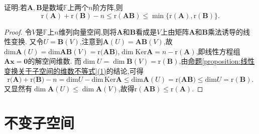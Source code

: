 \documentclass[lang=cn,newtx,10pt,scheme=chinese]{elegantbook}
\begin{document}
\begin{example}\label{example:4.243456}
证明:若\(\boldsymbol{A},\boldsymbol{B}\)是数域\(\mathbb{F}\)上两个\(n\)阶方阵,则
\[
\text{r}(\boldsymbol{A})+\text{r}(\boldsymbol{B})-n\leq\text{r}(\boldsymbol{A}\boldsymbol{B})\leq\min\{\text{r}(\boldsymbol{A}),\text{r}(\boldsymbol{B})\}.
\]
\end{example}
\begin{proof}
令\(V\)是\(\mathbb{F}\)上\(n\)维列向量空间,则将\(\boldsymbol{A}\)和\(\boldsymbol{B}\)看成是\(V\)上由矩阵\(\boldsymbol{A}\)和\(\boldsymbol{B}\)乘法诱导的线性变换. 又令\(U = \boldsymbol{B}(V)\),注意到\(\boldsymbol{A}(U)=\boldsymbol{A}\boldsymbol{B}(V)\),故\(\mathrm{dim}\boldsymbol{A}(U)=\mathrm{dim}\boldsymbol{AB}(V)=\mathrm{r(}\boldsymbol{AB})\),\(\dim\text{Ker}\boldsymbol{A}=n - \text{r}(\boldsymbol{A})\),即线性方程组\(\boldsymbol{A}\boldsymbol{x}=\boldsymbol{0}\)的解空间维数. 而\(\dim U=\dim\boldsymbol{B}(V)=\text{r}(\boldsymbol{B})\),由\hyperref[proposition:线性变换关于子空间的维数不等式]{命题\ref{proposition:线性变换关于子空间的维数不等式}(1)}的结论,可得
\[
\mathrm{r(}\boldsymbol{A})+\mathrm{r(}\boldsymbol{B})-n=\mathrm{dim}U-\mathrm{dim}\,\mathrm{Ker}\boldsymbol{A}\leqslant \mathrm{dim}\boldsymbol{A}\left( U \right) =\mathrm{r(}\boldsymbol{AB})\leqslant \mathrm{dim}U=\mathrm{r}\left( \boldsymbol{B} \right).
\]
又显然有\(\dim\boldsymbol{A}(U)\leq\dim\boldsymbol{A}(V)\),故得\(\text{r}(\boldsymbol{A}\boldsymbol{B})\leq\text{r}(\boldsymbol{A})\).
\end{proof}



\section{不变子空间}
\end{document}

